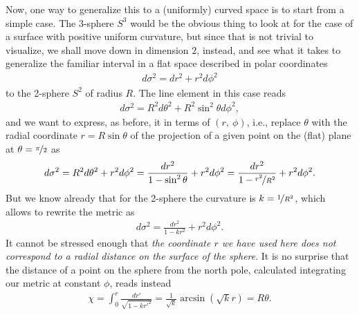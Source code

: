 Now, one way to generalize this to a (uniformly) curved space is to start from
a simple case. The 3-sphere $S^3$ would be the obvious thing to look at for the case
of a surface with positive uniform curvature, but since that is not trivial to visualize,
we shall move down in dimension $2$, instead, and see what it takes to generalize
the familiar interval in a flat space described in polar coordinates
\begin{align}\label{eq:polar_line_element_flat}
  d\sigma^2 = dr^2 + r^2 d\phi^2
\end{align}
to the 2-sphere $S^2$ of radius $R$. The line element in this case reads
\begin{align*}
  d\sigma^2 = R^2 d\theta^2 + R^2 \sin^2\theta d\phi^2,
\end{align*}
and we want to express, as before, it in terms of $(r,~\phi)$, i.e., replace $\theta$
with the radial coordinate $r = R\sin\theta$ of the projection of a given point on
the (flat) plane at $\theta = \nicefrac{\pi}{2}$ as
\begin{align*}
  d\sigma^2 = R^2 d\theta^2 + r^2 d\phi^2 =
  \frac{dr^2}{1 - \sin^2\theta} + r^2 d\phi^2 =
  \frac{dr^2}{1 - \nicefrac{r^2}{R^2}} + r^2 d\phi^2.
\end{align*}
But we know already that for the 2-sphere the curvature is $k = \nicefrac{1}{R^2}$,
which allows to rewrite the metric as
\begin{align}\label{eq:polar_line_element_two_shere}
  d\sigma^2 = \frac{dr^2}{1 - k r^2} + r^2 d\phi^2.
\end{align}
It cannot be stressed enough that \emph{the coordinate $r$ we have used here does
not correspond to a radial distance on the surface of the sphere}.
It is no surprise that the distance of a point on the sphere from the north pole,
calculated integrating our metric at constant $\phi$, reads instead
\begin{align}
  \chi = \int_0^r \frac{dr'}{\sqrt{1 - kr'^2}} = \frac{1}{\sqrt{k}} \arcsin(\sqrt{k} r) =
  R \theta.
\end{align}

